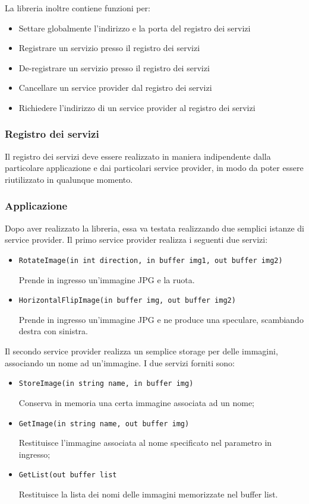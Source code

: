 \documentclass[a4paper,twoside]{article}
\begin{document}
La libreria inoltre contiene funzioni per:
\begin{itemize}
\item Settare globalmente l'indirizzo e la porta del registro dei servizi
\item Registrare un servizio presso il registro dei servizi
\item De-registrare un servizio presso il registro dei servizi
\item Cancellare un service provider dal registro dei servizi
\item Richiedere l'indirizzo di un service provider al registro dei servizi
\end{itemize}

\subsubsection{Registro dei servizi}
Il registro dei servizi deve essere realizzato in maniera indipendente dalla particolare applicazione e dai particolari service provider, in modo da poter essere riutilizzato in qualunque momento.

\subsubsection{Applicazione}
Dopo aver realizzato la libreria, essa va testata realizzando due semplici istanze di service provider. Il primo service provider realizza i seguenti due servizi:
\begin{itemize}
\item \texttt{RotateImage(in int direction, in buffer img1, out buffer img2)}\par
Prende in ingresso un'immagine JPG e la ruota.
\item \texttt{HorizontalFlipImage(in buffer img, out buffer img2)}\par
Prende in ingresso un'immagine JPG e ne produce una speculare, scambiando destra con sinistra.
\end{itemize}

Il secondo service provider realizza un semplice storage per delle immagini, associando
un nome ad un’immagine. I due servizi forniti sono:
\begin{itemize}
\item \texttt{StoreImage(in string name, in buffer img)}\par
Conserva in memoria una certa immagine associata ad un nome;
\item \texttt{GetImage(in string name, out buffer img)}\par
Restituisce l'immagine associata al nome specificato nel parametro in ingresso;
\item \texttt{GetList(out buffer list}\par
Restituisce la lista dei nomi delle immagini memorizzate nel buffer list.
\end{itemize}
\end{document}
